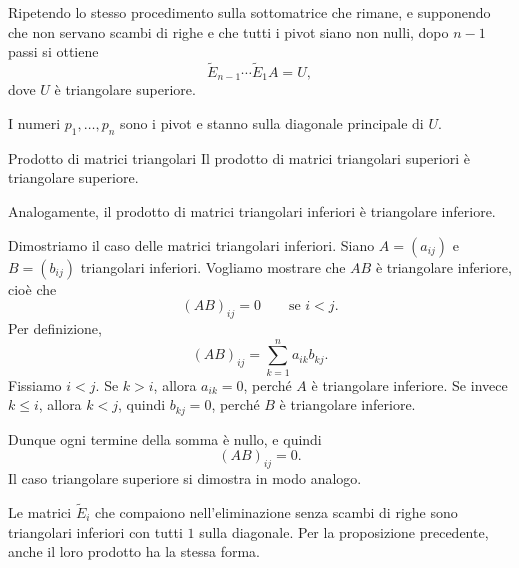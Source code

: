 \documentclass[a4paper]{article}
\begin{document}
Ripetendo lo stesso procedimento sulla sottomatrice che rimane, e supponendo che non servano scambi di righe e che tutti i pivot siano non nulli, dopo \(n-1\) passi si ottiene
\[
    \widetilde{E}_{n-1}\cdots \widetilde{E}_1A=U,
\]
dove \(U\) è triangolare superiore.

\begin{center}
\end{center}

I numeri \(p_1,\ldots,p_n\) sono i pivot e stanno sulla diagonale principale di \(U\).

\begin{snippetproposition}{Prodotto di matrici triangolari}
    Il prodotto di matrici triangolari superiori è triangolare superiore.

    Analogamente, il prodotto di matrici triangolari inferiori è triangolare inferiore.
\end{snippetproposition}

\begin{snippetproof}{}
    Dimostriamo il caso delle matrici triangolari inferiori. Siano \(A=(a_{ij})\) e \(B=(b_{ij})\) triangolari inferiori. Vogliamo mostrare che \(AB\) è triangolare inferiore, cioè che
    \[
        (AB)_{ij}=0
        \qquad
        \text{se } i<j.
    \]
    Per definizione,
    \[
        (AB)_{ij}=\sum_{k=1}^{n}a_{ik}b_{kj}.
    \]
    Fissiamo \(i<j\). Se \(k>i\), allora \(a_{ik}=0\), perché \(A\) è triangolare inferiore. Se invece \(k\leq i\), allora \(k<j\), quindi \(b_{kj}=0\), perché \(B\) è triangolare inferiore.

    Dunque ogni termine della somma è nullo, e quindi
    \[
        (AB)_{ij}=0.
    \]
    Il caso triangolare superiore si dimostra in modo analogo.
\end{snippetproof}

Le matrici \(\widetilde{E}_i\) che compaiono nell'eliminazione senza scambi di righe sono triangolari inferiori con tutti \(1\) sulla diagonale. Per la proposizione precedente, anche il loro prodotto ha la stessa forma.
\end{document}
